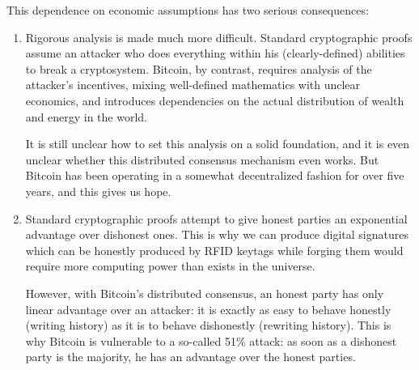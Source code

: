 \documentclass[letterpaper]{article}
\begin{document}
This dependence on economic assumptions has two serious consequences:
\begin{enumerate}
\item Rigorous analysis is made much more difficult. Standard cryptographic proofs
assume an attacker who does everything within his (clearly-defined) abilities to
break a cryptosystem. Bitcoin, by contrast, requires analysis of the attacker's
incentives, mixing well-defined mathematics with unclear economics, and introduces
dependencies on the actual distribution of wealth and energy in the world.

It is still unclear how to set this analysis on a solid foundation, and it is even
unclear whether this distributed consensus mechanism even works. But Bitcoin has
been operating in a somewhat decentralized fashion for over five years, and this
gives us hope.

\item Standard cryptographic proofs attempt to give honest parties an exponential
advantage over dishonest ones. This is why we can produce digital signatures which
can be honestly produced by RFID keytags while forging them would require more
computing power than exists in the universe.

However, with Bitcoin's distributed consensus, an honest party has only linear
advantage over an attacker: it is exactly as easy to behave honestly (writing history)
as it is to behave dishonestly (rewriting history). This is why Bitcoin is
vulnerable to a so-called 51\% attack: as soon as a dishonest party is the majority,
he has an advantage over the honest parties.
\end{enumerate}
\end{document}
